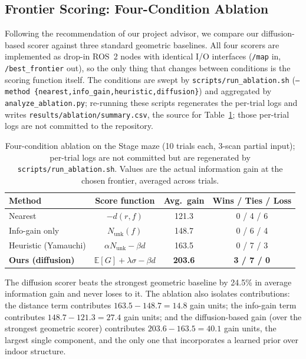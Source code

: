 \documentclass[conference]{IEEEtran}
\begin{document}
\subsection{Frontier Scoring: Four-Condition Ablation}
\label{sec:ablation}

Following the recommendation of our project advisor, we compare our
diffusion-based scorer against three standard geometric baselines.
All four scorers are implemented as drop-in ROS~2 nodes with
identical I/O interfaces (\texttt{/map} in, \texttt{/best\_frontier}
out), so the only thing that changes between conditions is the
scoring function itself. The conditions are swept by
\texttt{scripts/run\_ablation.sh} (\texttt{--method
\{nearest,info\_gain,heuristic,diffusion\}}) and aggregated by
\texttt{analyze\_ablation.py}; re-running these scripts regenerates the per-trial logs and writes
\texttt{results/ablation/summary.csv}, the source for
Table~\ref{tab:ablation}; those per-trial logs are not committed to
the repository.

\begin{table}[h]
  \centering
  \caption{Four-condition ablation on the Stage maze (10 trials each, 3-scan partial input); per-trial logs are not committed but are regenerated by \texttt{scripts/run\_ablation.sh}. Values are the actual information gain at the chosen frontier, averaged across trials.}
  \label{tab:ablation}
  \begin{tabular}{lccc}
    \toprule
    Method                                   & Score function                     & Avg.\ gain  & Wins / Ties / Loss \\
    \midrule
    Nearest                                  & $-d(r, f)$                         & 121.3       & 0 / 4 / 6 \\
    Info-gain only                           & $N_{\text{unk}}(f)$                & 148.7       & 0 / 6 / 4 \\
    Heuristic (Yamauchi)                     & $\alpha N_{\text{unk}} - \beta d$  & 163.5       & 0 / 7 / 3 \\
    \textbf{Ours (diffusion)}                & $\mathbb{E}[G] + \lambda\sigma - \beta d$ & \textbf{203.6} & \textbf{3 / 7 / 0} \\
    \bottomrule
  \end{tabular}
\end{table}

The diffusion scorer beats the strongest geometric baseline by 24.5\%
in average information gain and never loses to it. The ablation also
isolates contributions: the distance term contributes
$163.5 - 148.7 = 14.8$ gain units; the info-gain term contributes
$148.7 - 121.3 = 27.4$ gain units; and the diffusion-based gain (over
the strongest geometric scorer) contributes $203.6 - 163.5 = 40.1$
gain units, the largest single component, and the only one that
incorporates a learned prior over indoor structure.
\end{document}
